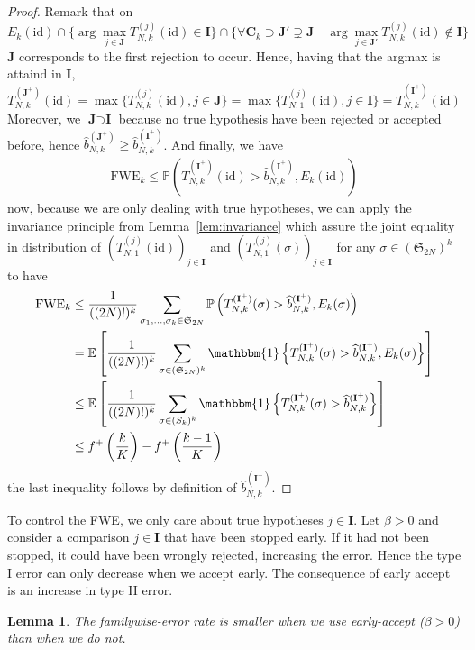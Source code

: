 \documentclass{article}
\theoremstyle{plain}
\newtheorem{Lemma}{Lemma}
\theoremstyle{remark}
\renewcommand{\P}{\mathbb{P}}
\newcommand{\E}{\mathbb{E}}
\renewcommand{\S}{\mathfrak{S}}
\newcommand{\1}{\mathbbm{1}}
\newcommand{\id}{\mathrm{id}}
\numberwithin{equation}{section}
\begin{document}
\begin{proof}
Remark that on $$E_k(\id) \cap \{\arg\max_{j \in \textbf{J}}T_{N,k}^{(j)}(\id) \in \textbf{I}\}\cap\{ \forall \textbf{C}_k \supset \textbf{J}'\supsetneq\textbf{J} \quad  \arg\max_{j \in \textbf{J}'}T_{N,k}^{(j)}(\id) \notin \textbf{I}\}  $$
$\textbf{J}$ corresponds to the first rejection to occur. Hence, having that the argmax is attaind in $\textbf{I}$,
$$T_{N,k}^{(\textbf{J}^+)}(\id)= \max\{T_{N,k}^{(j)}(\id), j \in \textbf{J}\} = \max\{T_{N,1}^{(j)}(\id), j \in \textbf{I}\} = T_{N,k}^{(\textbf{I}^+)}(\id)$$
Moreover, we $\textbf{J} \supset \textbf{I}$ because no true hypothesis have been rejected or accepted before, hence $\widehat{b}_{N,k}^{(\textbf{J}^+)} \ge \widehat{b}_{N,k}^{(\textbf{I}^+)}$. And finally, we have 
\begin{align*}
\mathrm{FWE}_k\le \P\left( T_{N,k}^{(\textbf{I}^+)}(\id) > \widehat{b}_{N,k}^{(\textbf{I}^+)}, E_k(\id) \right)
\end{align*}
now, because we are only dealing with true hypotheses, we can apply the invariance principle from Lemma~\ref{lem:invariance} which assure the joint equality in distribution of $(T_{N,1}^{(j)}(\id))_{j \in \textbf{I}}$ and $( T_{N,1}^{(j)}(\sigma))_{j \in \textbf{I}}$ for any $\sigma \in (\S_{2N})^k$ to have
\begin{align*}
\mathrm{FWE}_k &\le \frac{1}{((2N)!)^k}\sum_{\sigma_1,\dots,\sigma_k \in \S_{2N}}\P\left( T_{N,k}^{(\textbf{I}^+)}(\sigma) > \widehat{b}_{N,k}^{(\textbf{I}^+)}, E_k(\sigma) \right)\\
&= \E\left[\frac{1}{((2N)!)^k}\sum_{\sigma \in (\S_{2N})^k}\1\left\{ T_{N,k}^{(\textbf{I}^+)}(\sigma) > \widehat{b}_{N,k}^{(\textbf{I}^+)}, E_k(\sigma)\right\} \right]\\
&\le \E\left[\frac{1}{((2N)!)^k}\sum_{\sigma \in (S_k)^k}\1\left\{ T_{N,k}^{(\textbf{I}^+)}(\sigma) > \widehat{b}_{N,k}^{(\textbf{I}^+)}\right\} \right]\\
&\le f^+\left(\frac{k}{K}\right)-f^+\left(\frac{k-1}{K}\right)\\
\end{align*}
the last inequality follows by definition of $\widehat{b}_{N,k}^{(\textbf{I}^+)}$.
\end{proof}
To control the FWE, we only care about true hypotheses $j \in \textbf{I}$. Let $\beta>0$ and consider a comparison $j \in \textbf{I}$ that have been stopped early. If it had not been stopped, it could have been wrongly rejected, increasing the error. Hence the type I error can only decrease when we accept early. The consequence of early accept is an increase in type II error.
\begin{Lemma}
The familywise-error rate is smaller when we use early-accept ($\beta>0$) than when we do not.
\end{Lemma}
\end{document}
